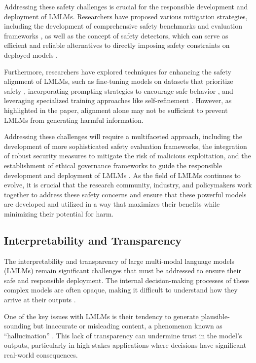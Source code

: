 \documentclass[11pt]{article}
\begin{document}
Addressing these safety challenges is crucial for the responsible development and deployment of LMLMs. Researchers have proposed various mitigation strategies, including the development of comprehensive safety benchmarks and evaluation frameworks \cite{ref328}, as well as the concept of safety detectors, which can serve as efficient and reliable alternatives to directly imposing safety constraints on deployed models \cite{ref104}.

Furthermore, researchers have explored techniques for enhancing the safety alignment of LMLMs, such as fine-tuning models on datasets that prioritize safety \cite{ref329}, incorporating prompting strategies to encourage safe behavior \cite{ref330}, and leveraging specialized training approaches like self-refinement \cite{ref326}. However, as highlighted in the \cite{ref331} paper, alignment alone may not be sufficient to prevent LMLMs from generating harmful information.

Addressing these challenges will require a multifaceted approach, including the development of more sophisticated safety evaluation frameworks, the integration of robust security measures to mitigate the risk of malicious exploitation, and the establishment of ethical governance frameworks to guide the responsible development and deployment of LMLMs \cite{ref277}. As the field of LMLMs continues to evolve, it is crucial that the research community, industry, and policymakers work together to address these safety concerns and ensure that these powerful models are developed and utilized in a way that maximizes their benefits while minimizing their potential for harm.

\subsection{Interpretability and Transparency}

The interpretability and transparency of large multi-modal language models (LMLMs) remain significant challenges that must be addressed to ensure their safe and responsible deployment. The internal decision-making processes of these complex models are often opaque, making it difficult to understand how they arrive at their outputs \cite{ref332}.

One of the key issues with LMLMs is their tendency to generate plausible-sounding but inaccurate or misleading content, a phenomenon known as ``hallucination'' \cite{ref333}. This lack of transparency can undermine trust in the model's outputs, particularly in high-stakes applications where decisions have significant real-world consequences.
\end{document}
